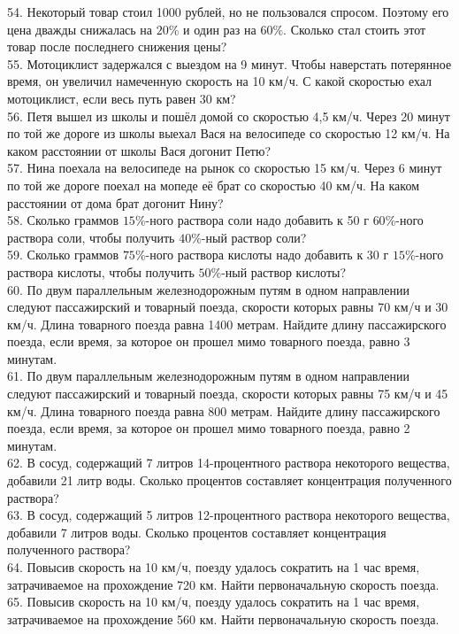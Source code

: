 54. Некоторый товар стоил 1000 рублей, но не пользовался спросом. Поэтому его цена дважды снижалась на $20\%$ и один раз на $60\%.$ Сколько стал стоить этот товар после последнего снижения цены?\\
55. Мотоциклист задержался с выездом на 9 минут. Чтобы наверстать потерянное время, он увеличил намеченную скорость на 10 км/ч. С какой скоростью ехал мотоциклист, если весь путь равен 30 км?\\
56. Петя вышел из школы и пошёл домой со скоростью 4,5 км/ч. Через 20 минут по той же дороге из школы выехал Вася на велосипеде со скоростью 12 км/ч. На каком расстоянии от школы Вася догонит Петю?\\
57. Нина поехала на велосипеде на рынок со скоростью 15 км/ч. Через 6 минут по той же дороге поехал на мопеде её брат со скоростью 40 км/ч. На каком расстоянии от дома брат догонит Нину?\\
58. Сколько граммов $15\%$-ного раствора соли надо добавить к 50 г $60\%$-ного раствора соли, чтобы получить $40\%$-ный раствор соли?\\
59. Сколько граммов $75\%$-ного раствора кислоты надо добавить к 30 г $15\%$-ного раствора кислоты, чтобы получить $50\%$-ный раствор кислоты?\\
60. По двум параллельным железнодорожным путям в одном направлении следуют пассажирский и товарный поезда, скорости которых равны 70 км/ч и 30 км/ч. Длина товарного поезда равна 1400 метрам. Найдите длину пассажирского поезда, если время, за которое он прошел мимо товарного поезда, равно 3 минутам.\\
61. По двум параллельным железнодорожным путям в одном направлении следуют пассажирский и товарный поезда, скорости которых равны 75 км/ч и 45 км/ч. Длина товарного поезда равна 800 метрам. Найдите длину пассажирского поезда, если время, за которое он прошел мимо товарного поезда, равно 2 минутам.\\
62. В сосуд, содержащий 7 литров 14-процентного раствора некоторого вещества, добавили 21 литр воды. Сколько процентов составляет концентрация полученного раствора?\\
63. В сосуд, содержащий 5 литров 12-процентного раствора некоторого вещества, добавили 7 литров воды. Сколько процентов составляет концентрация полученного раствора?\\
64. Повысив скорость на 10 км/ч, поезду удалось сократить на 1 час время, затрачиваемое на прохождение 720 км. Найти первоначальную скорость поезда.\\
65. Повысив скорость на 10 км/ч, поезду удалось сократить на 1 час время, затрачиваемое на прохождение 560 км. Найти первоначальную скорость поезда.\\
